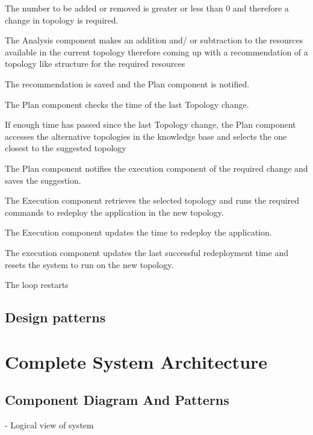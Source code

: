 \begin{usecase}
{	\item The number to be added or removed is greater or less than 0 and therefore a change in topology is required.
	\item The Analysis component makes an addition and/ or subtraction to the resources available in the current topology therefore coming up with a recommendation of a topology like structure for the required resources
	\item The recommendation is saved and the Plan component is notified.
	\item The Plan component checks the time of the last Topology change.
	\item If enough time has passed since the last Topology change, the Plan component accesses the alternative topologies in the knowledge base and selects the one closest to the suggested topology
	\item The Plan component notifies the execution component of the required change and saves the suggestion.
	\item The Execution component retrieves the selected topology and runs the required commands to redeploy the application in the new topology.
	\item The Execution component updates the time to redeploy the application.
	\item The execution component updates the last successful redeployment time and resets the system to run on the new topology.
	\item The loop restarts}
 \end{usecase}
 
\subsection{Design patterns}

\section{Complete System Architecture}
\subsection{Component Diagram And Patterns}
- Logical view of system

